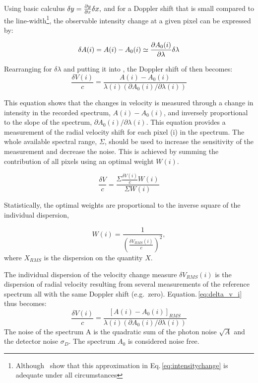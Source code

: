 Using basic calculus \(\delta y = \frac{\partial{y}}{\partial{x}} \delta x,  \nonumber\) and for a Doppler shift that is small compared to the line-width\footnote{Although~\citet{connes_absolute_1985} show that this approximation in Eq.\,\ref{eq:intensitychange} is adequate under all circumstances}, the observable intensity change at a given pixel can be expressed by:

\begin{equation}
\delta A(i) = A(i) - A_0(i) \simeq \frac{\partial{A_0(i)}}{\partial{\lambda}} \delta \lambda
\label{eq:intensitychange}
\end{equation}

Rearranging  for \(\delta \lambda\) and putting it into , the Doppler shift of then becomes:
\begin{equation}
    \frac{\delta V(i)}{c} = \frac{A(i) - A_0(i) }{\lambda(i) (\partial A_0(i)/\partial \lambda(i))} \label{eq:delta_v_i}
\end{equation}

This equation shows that the changes in velocity is measured through a change in intensity in the recorded spectrum, \(A(i)-A_0(i)\), and inversely proportional to the slope of the spectrum, \({\partial A_0(i)}/{\partial \lambda(i)}\).
This equation provides a measurement of the radial velocity shift for each pixel (i) in the spectrum. The whole available spectral range, \(\Sigma\), should be used to increase the sensitivity of the measurement and decrease the noise. This is achieved by summing the contribution of all pixels using an optimal weight \(W(i)\).

\begin{equation}
\frac{\delta V}{c} = \frac{\Sigma{\frac{\delta V(i)}{c}W(i)}}{\Sigma {W(i)}}
\end{equation}

Statistically, the optimal weights are proportional to the inverse square of the individual dispersion,


\begin{equation}
W(i) = \frac{1}{{\left(\frac{\delta V_{RMS}(i)}{c}\right)}^{2}},  \label{eq:weights}
\end{equation}
where \(X_{RMS}\) is the dispersion on the quantity \(X\).


The individual dispersion of the velocity change measure \(\delta V_{RMS}(i)\) is the dispersion of radial velocity resulting from several measurements of the reference spectrum all with the same Doppler shift (e.g.\ zero). Equation.\,\ref{eq:delta_v_i} thus becomes:
\begin{equation}
    \frac{\delta V(i)}{c} = \frac{{[A(i) - A_0(i)]}_{RMS} }{\lambda(i) (\partial A_0(i)/\partial \lambda(i))} \label{eq:delta_v_i_rms}
\end{equation}
The noise of the spectrum A is the quadratic sum of the photon noise \(\sqrt{A}\) and the detector noise \(\sigma_D\). The spectrum \(A_0\) is considered noise free.

